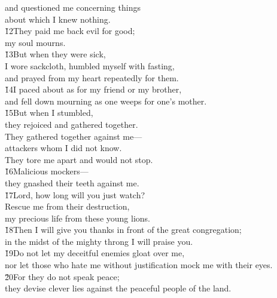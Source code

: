 \begin{poetry}
\poemll    and questioned me concerning things \\
\poemlll       about which I knew nothing. \\
\poeml \v{12}They paid me back evil for good; \\
\poemll    my soul mourns. \\
\poeml \v{13}But when they were sick, \\
\poemll    I wore sackcloth, humbled myself with fasting, \\
\poemlll       and prayed from my heart repeatedly for them. \\
\poeml \v{14}I paced about as for my friend or my brother, \\
\poemll    and fell down mourning as one weeps for one's mother. \\
\poeml \v{15}But when I stumbled, \\
\poemll    they rejoiced and gathered together. \\
\poeml They gathered together against me--- \\
\poemll    attackers whom I did not know. \\
\poemlll       They tore me apart and would not stop. \\
\poeml \v{16}Malicious mockers--- \\
\poemll    they gnashed their teeth against me. \\
\poeml \v{17}Lord, how long will you just watch? \\
\poemll    Rescue me from their destruction, \\
\poemlll       my precious life from these young lions. \\
\poeml \v{18}Then I will give you thanks in front of the great congregation; \\
\poemll    in the midst of the mighty throng I will praise you. \\
\poeml \v{19}Do not let my deceitful enemies gloat over me, \\
\poemll    nor let those who hate me without justification mock me with their eyes. \\
\poeml \v{20}For they do not speak peace; \\
\poemll    they devise clever lies against the peaceful people of the land. \\

\end{poetry}

